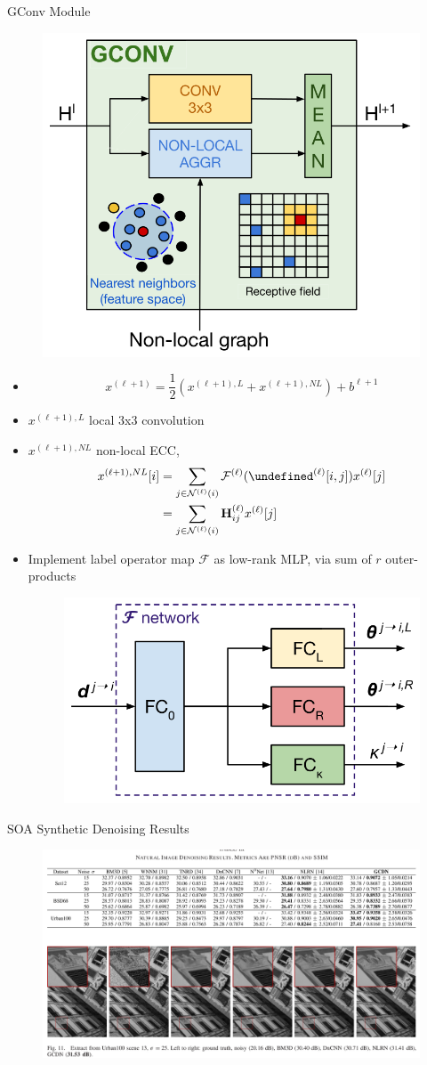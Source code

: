 \documentclass{beamer}
\newcommand{\N}{\mathcal N} %
\let\L\undefined
\newcommand{\L}{\mathcal L} %
\begin{document}
\begin{frame}[allowframebreaks]{GConv Module \cite{ValsesiaICIP19}}
\begin{figure}[H]
\includegraphics[width=0.3\linewidth]{../imgs/nlagg.png}
\end{figure}
\begin{itemize}
\item $$x^{(\ell+1)} = \frac{1}{2}\left( x^{(\ell+1),L} + x^{(\ell+1),NL} \right) + b^{\ell+1}$$
\item $x^{(\ell+1),L}$ local 3x3 convolution
\item $x^{(\ell+1),NL}$ non-local ECC,
\begin{align}
x^{(\ell+1),NL}[i] &= \sum_{j \in \N^{(\ell)}(i)} \mathcal{F}^{(\ell)}(\L^{(\ell)}[i,j])x^{(\ell)}[j] \\
&= \sum_{j \in \N^{(\ell)}(i)} \mathbf{H}^{(\ell)}_{ij}x^{(\ell)}[j]
\end{align}
\item Implement label operator map $\mathcal{F}$ as low-rank MLP, via sum of $r$ outer-products
\begin{figure}[H]
\includegraphics[width=0.3\linewidth]{../imgs/label_operator_map.png}
\end{figure}
\end{itemize}
\end{frame}

\begin{frame}{SOA Synthetic Denoising Results \cite{ValsesiaICIP19}}
\begin{figure}[H]
\includegraphics[width=\linewidth]{../imgs/soa_synth_000.png}
\end{figure}
\end{frame}
\end{document}

